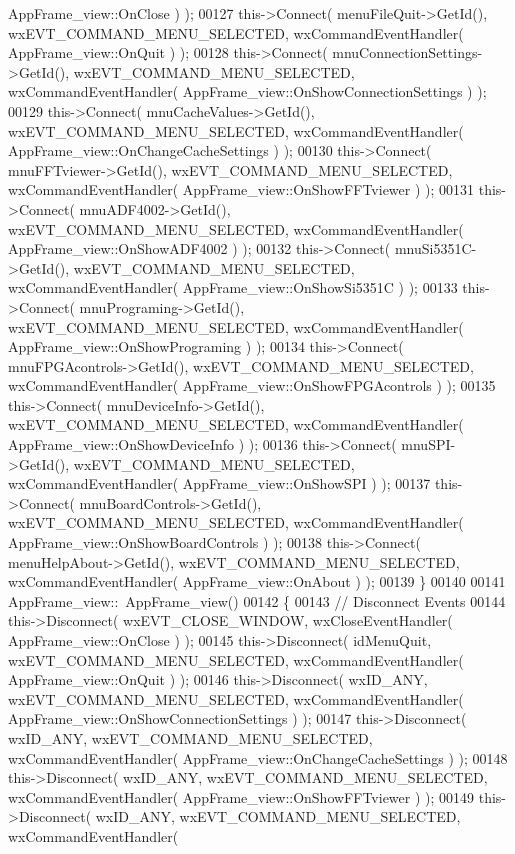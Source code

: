 \begin{DoxyCode}
      AppFrame_view::OnClose ) );
00127     this->Connect( menuFileQuit->GetId(), wxEVT\_COMMAND\_MENU\_SELECTED, wxCommandEventHandler( 
      AppFrame_view::OnQuit ) );
00128     this->Connect( mnuConnectionSettings->GetId(), wxEVT\_COMMAND\_MENU\_SELECTED, wxCommandEventHandler( 
      AppFrame_view::OnShowConnectionSettings ) );
00129     this->Connect( mnuCacheValues->GetId(), wxEVT\_COMMAND\_MENU\_SELECTED, wxCommandEventHandler( 
      AppFrame_view::OnChangeCacheSettings ) );
00130     this->Connect( mnuFFTviewer->GetId(), wxEVT\_COMMAND\_MENU\_SELECTED, wxCommandEventHandler( 
      AppFrame_view::OnShowFFTviewer ) );
00131     this->Connect( mnuADF4002->GetId(), wxEVT\_COMMAND\_MENU\_SELECTED, wxCommandEventHandler( 
      AppFrame_view::OnShowADF4002 ) );
00132     this->Connect( mnuSi5351C->GetId(), wxEVT\_COMMAND\_MENU\_SELECTED, wxCommandEventHandler( 
      AppFrame_view::OnShowSi5351C ) );
00133     this->Connect( mnuPrograming->GetId(), wxEVT\_COMMAND\_MENU\_SELECTED, wxCommandEventHandler( 
      AppFrame_view::OnShowPrograming ) );
00134     this->Connect( mnuFPGAcontrols->GetId(), wxEVT\_COMMAND\_MENU\_SELECTED, wxCommandEventHandler( 
      AppFrame_view::OnShowFPGAcontrols ) );
00135     this->Connect( mnuDeviceInfo->GetId(), wxEVT\_COMMAND\_MENU\_SELECTED, wxCommandEventHandler( 
      AppFrame_view::OnShowDeviceInfo ) );
00136     this->Connect( mnuSPI->GetId(), wxEVT\_COMMAND\_MENU\_SELECTED, wxCommandEventHandler( 
      AppFrame_view::OnShowSPI ) );
00137     this->Connect( mnuBoardControls->GetId(), wxEVT\_COMMAND\_MENU\_SELECTED, wxCommandEventHandler( 
      AppFrame_view::OnShowBoardControls ) );
00138     this->Connect( menuHelpAbout->GetId(), wxEVT\_COMMAND\_MENU\_SELECTED, wxCommandEventHandler( 
      AppFrame_view::OnAbout ) );
00139 \}
00140 
00141 AppFrame_view::~AppFrame_view()
00142 \{
00143     \textcolor{comment}{// Disconnect Events}
00144     this->Disconnect( wxEVT\_CLOSE\_WINDOW, wxCloseEventHandler( 
      AppFrame_view::OnClose ) );
00145     this->Disconnect( idMenuQuit, wxEVT\_COMMAND\_MENU\_SELECTED, wxCommandEventHandler( 
      AppFrame_view::OnQuit ) );
00146     this->Disconnect( wxID\_ANY, wxEVT\_COMMAND\_MENU\_SELECTED, wxCommandEventHandler( 
      AppFrame_view::OnShowConnectionSettings ) );
00147     this->Disconnect( wxID\_ANY, wxEVT\_COMMAND\_MENU\_SELECTED, wxCommandEventHandler( 
      AppFrame_view::OnChangeCacheSettings ) );
00148     this->Disconnect( wxID\_ANY, wxEVT\_COMMAND\_MENU\_SELECTED, wxCommandEventHandler( 
      AppFrame_view::OnShowFFTviewer ) );
00149     this->Disconnect( wxID\_ANY, wxEVT\_COMMAND\_MENU\_SELECTED, wxCommandEventHandler( 

\end{DoxyCode}
